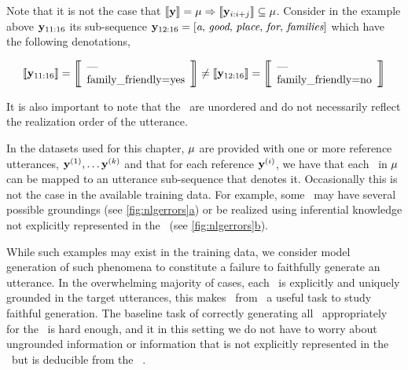 Note that it is not the case that $\left\llbracket \mathbf{y} \right\rrbracket = \mu \Rightarrow \left\llbracket \mathbf{y}_{i:i+j} \right\rrbracket \subseteq \mu$. Consider in the example above $\mathbf{y}_{11:16}$ its sub-sequence $\mathbf{y}_{12:16} = \left[\textit{a},\,\textit{good},\,\textit{place},\,\textit{for},\,\textit{families}\right]$ which have
the following denotations,
\begin{singlespace}
   \[
   \denotes{\utttoks_{11:16}} = \left[\!\!\left[\begin{array}{l}\textrm{---}\\ \AV{family\_friendly}{yes} \end{array}\right]\!\!\right] \ne \denotes{\utttoks_{12:16}}= \left[\!\!\left[\begin{array}{l}\textrm{---}\\ \AV{family\_friendly}{no} \end{array}\right]\!\!\right] 
       \]
   \end{singlespace}
\noindent It is also important to note that the \attributevalues~are unordered
and do not necessarily reflect the realization order of the utterance. 

In the datasets used for this chapter, $\mu$ are provided with one or more
reference utterances, $\mathbf{y}^{(1)}, \ldots \mathbf{y}^{(k)}$ and that for each
reference $\mathbf{y}^{(i)}$, we have that each \attributevalue~in $\mu$ can be
mapped to an utterance sub-sequence that denotes it.  Occasionally this is not
the case in the available training data. For example, some \attributevalues~may
have several possible groundings (see
\hyperref[fig:nlgerrors]{\autoref{fig:nlgerrors}a}) or be realized using
inferential knowledge not explicitly represented in the
\meaningrepresentation~(see
\hyperref[fig:nlgerrors]{\autoref{fig:nlgerrors}b}). 



While such examples may exist in the training data, we consider model
generation of such phenomena to constitute a failure to faithfully generate an
utterance.  In the overwhelming majority of cases, each \attributevalue~is
explicitly and uniquely grounded in the target utterances, this makes
\surfacerealization~from \meaningrepresentations~a useful task to study
faithful generation. The baseline task of correctly generating all
\attributevalues~appropriately for the \dialogueact~is hard enough, and it in
this setting we do not have to worry about ungrounded information or
information that is not explicitly represented in the
\meaningrepresentations~but is deducible from the
\meaningrepresentation~\citep{wiseman2017}.  
